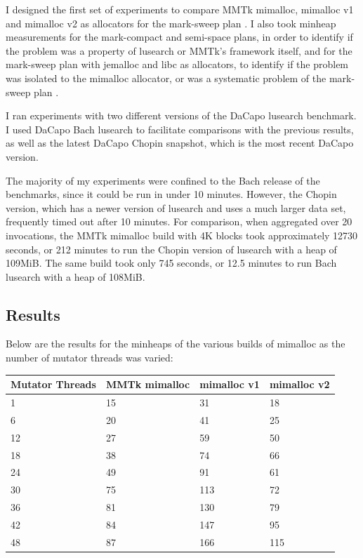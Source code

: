 \documentclass{article}
\begin{document}
I designed the first set of experiments to compare MMTk mimalloc, mimalloc v1 and mimalloc v2 as allocators for the mark-sweep plan \cite{leijen2019mimalloc,mmtk-core}. I also took minheap measurements for the mark-compact and semi-space plans, in order to identify if the problem was a property of lusearch or MMTk's framework itself, and for the mark-sweep plan with jemalloc and libc as allocators, to identify if the problem was isolated to the mimalloc allocator, or was a systematic problem of the mark-sweep plan \cite{blackburn2004myths,evans2006scalable,mmtk-core}.

I ran experiments with two different versions of the DaCapo lusearch benchmark. I used DaCapo Bach lusearch to facilitate comparisons with the previous results, as well as the latest DaCapo Chopin snapshot, which is the most recent DaCapo version.

The majority of my experiments were confined to the Bach release of the benchmarks, since it could be run in under 10 minutes. However, the Chopin version, which has a newer version of lusearch and uses a much larger data set, frequently timed out after 10 minutes. For comparison, when aggregated over 20 invocations, the MMTk mimalloc build with 4K blocks took approximately 12730 seconds, or 212 minutes to run the Chopin version of lusearch with a heap of 109MiB. The same build took only 745 seconds, or 12.5 minutes to run Bach lusearch with a heap of 108MiB.

\subsection{Results}
Below are the results for the minheaps of the various builds of mimalloc as the number of mutator threads was varied:
\begin{center}
    \begin{tabular}{|l|l|l|l|}
        \hline
        Mutator Threads & MMTk mimalloc & mimalloc v1 & mimalloc v2\\
        \hline
        1 & 15 & 31 & 18\\
        \hline
        6 & 20 & 41 & 25\\
        \hline
        12 & 27 & 59 & 50\\
        \hline
        18 & 38 & 74 & 66\\
        \hline
        24 & 49 & 91 & 61\\
        \hline
        30 & 75 & 113 & 72\\
        \hline
        36 & 81 & 130 & 79\\
        \hline
        42 & 84 & 147 & 95\\
        \hline
        48 & 87 & 166 & 115\\
        \hline
    \end{tabular}
\end{center}
\end{document}

